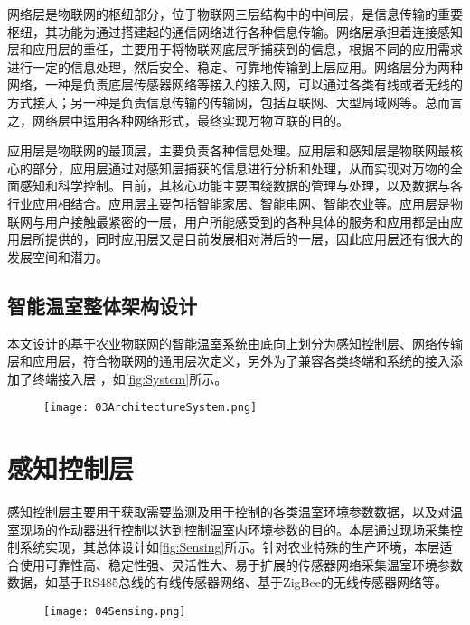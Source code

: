 网络层是物联网的枢纽部分，位于物联网三层结构中的中间层，是信息传输的重要枢纽，其功能为通过搭建起的通信网络进行各种信息传输。网络层承担着连接感知层和应用层的重任，主要用于将物联网底层所捕获到的信息，根据不同的应用需求进行一定的信息处理，然后安全、稳定、可靠地传输到上层应用。网络层分为两种网络，一种是负责底层传感器网络等接入的接入网，可以通过各类有线或者无线的方式接入；另一种是负责信息传输的传输网，包括互联网、大型局域网等。总而言之，网络层中运用各种网络形式，最终实现万物互联的目的。

应用层是物联网的最顶层，主要负责各种信息处理\supercite{DengMiwen2015}。应用层和感知层是物联网最核心的部分，应用层通过对感知层捕获的信息进行分析和处理，从而实现对万物的全面感知和科学控制。目前，其核心功能主要围绕数据的管理与处理，以及数据与各行业应用相结合。应用层主要包括智能家居、智能电网、智能农业等。应用层是物联网与用户接触最紧密的一层，用户所能感受到的各种具体的服务和应用都是由应用层所提供的，同时应用层又是目前发展相对滞后的一层，因此应用层还有很大的发展空间和潜力。

	
	\subsection{智能温室整体架构设计}
本文设计的基于农业物联网的智能温室系统由底向上划分为感知控制层、网络传输层和应用层，符合物联网的通用层次定义，另外为了兼容各类终端和系统的接入添加了终端接入层\supercite{WangHuaiyu2015} ，如\ref{fig:System}所示。	
	\begin{figure}[!htbp]
		\centering
		\texttt{[image: 03ArchitectureSystem.png]}
	\end{figure}	
\section{感知控制层}
感知控制层主要用于获取需要监测及用于控制的各类温室环境参数数据，以及对温室现场的作动器进行控制以达到控制温室内环境参数的目的。本层通过现场采集控制系统实现，其总体设计如\ref{fig:Sensing}所示。针对农业特殊的生产环境，本层适合使用可靠性高、稳定性强、灵活性大、易于扩展的传感器网络采集温室环境参数数据，如基于RS485总线的有线传感器网络、基于ZigBee的无线传感器网络等。
	\begin{figure}[!htbp]
		\centering
		\texttt{[image: 04Sensing.png]}
	\end{figure}

